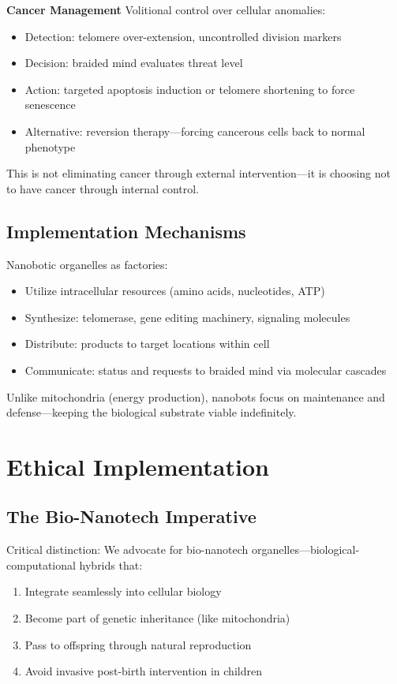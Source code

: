 \documentclass[reprint, amsmath, amssymb, aps, prd]{revtex4-2}
\begin{document}
\textbf{Cancer Management} Volitional control over cellular anomalies:
\begin{itemize}
    \item Detection: telomere over-extension, uncontrolled division markers
    \item Decision: braided mind evaluates threat level
    \item Action: targeted apoptosis induction or telomere shortening to force senescence
    \item Alternative: reversion therapy---forcing cancerous cells back to normal phenotype
\end{itemize}

This is not eliminating cancer through external intervention---it is choosing not to have cancer through internal control.

\subsection{Implementation Mechanisms}

Nanobotic organelles as factories:
\begin{itemize}
    \item Utilize intracellular resources (amino acids, nucleotides, ATP)
    \item Synthesize: telomerase, gene editing machinery, signaling molecules
    \item Distribute: products to target locations within cell
    \item Communicate: status and requests to braided mind via molecular cascades
\end{itemize}

Unlike mitochondria (energy production), nanobots focus on maintenance and defense---keeping the biological substrate viable indefinitely.

\section{Ethical Implementation}

\subsection{The Bio-Nanotech Imperative}

Critical distinction: We advocate for bio-nanotech organelles---biological-computational hybrids that:
\begin{enumerate}
    \item Integrate seamlessly into cellular biology
    \item Become part of genetic inheritance (like mitochondria)
    \item Pass to offspring through natural reproduction
    \item Avoid invasive post-birth intervention in children
\end{enumerate}
\end{document}
